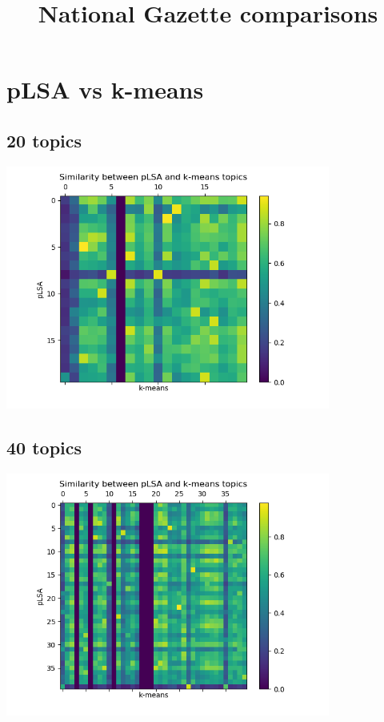 \documentclass[12pt, letterpaper]{article}
\title{National Gazette comparisons}
\author{}
\date{}
\begin{document}
\maketitle

\section{pLSA vs k-means}

\subsection{20 topics}

\begin{center}
	\includegraphics[width = 0.8\textwidth]{National_Gazette_plsa_vs_k_means_20_topics_similarity_plot}
\end{center}



\subsection{40 topics}

\begin{center}
	\includegraphics[width = 0.8\textwidth]{National_Gazette_plsa_vs_k_means_40_topics_similarity_plot}
\end{center}


\end{document}
